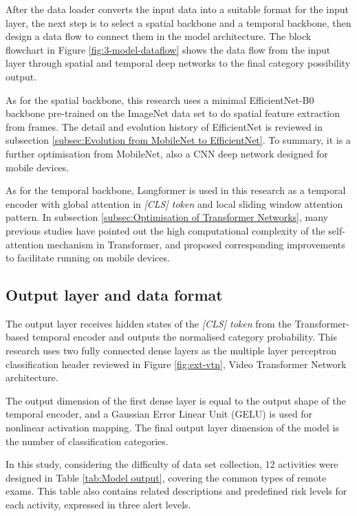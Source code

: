 After the data loader converts the input data into a suitable format for the input layer, the next step is to select a spatial backbone and a temporal backbone, then design a data flow to connect them in the model architecture.
The block flowchart in Figure \ref{fig:3-model-dataflow} shows the data flow from the input layer through spatial and temporal deep networks to the final category possibility output.

As for the spatial backbone, this research uses a minimal EfficientNet-B0 backbone pre-trained on the ImageNet data set to do spatial feature extraction from frames.
The detail and evolution history of EfficientNet is reviewed in subsection  \ref{subsec:Evolution from MobileNet to EfficientNet}.
To summary, it is a further optimisation from MobileNet, also a CNN deep network designed for mobile devices.

As for the temporal backbone, Longformer is used in this research as a temporal encoder with global attention in \textit{[CLS] token} and local sliding window attention pattern.
In subsection \ref{subsec:Optimisation of Transformer Networks}, many previous studies have pointed out the high computational complexity of the self-attention mechanism in Transformer, and proposed corresponding improvements to facilitate running on mobile devices.

\subsection{Output layer and data format}
The output layer receives hidden states of the \textit{[CLS] token} from the Transformer-based temporal encoder and outputs the normalised category probability.
This research uses two fully connected dense layers as the multiple layer perceptron classification header reviewed in Figure \ref{fig:ext-vtn}, Video Transformer Network architecture.

The output dimension of the first dense layer is equal to the output shape of the temporal encoder, and a Gaussian Error Linear Unit (GELU) is used for nonlinear activation mapping.
The final output layer dimension of the model is the number of classification categories.

In this study, considering the difficulty of data set collection, 12 activities were designed in Table \ref{tab:Model output}, covering the common types of remote exams.
This table also contains related descriptions and predefined risk levels for each activity, expressed in three alert levels.

